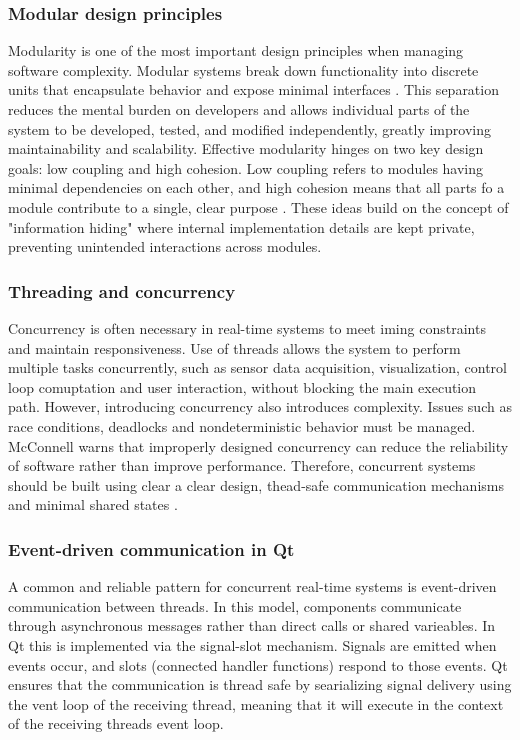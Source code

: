 \subsubsection{Modular design principles}
Modularity is one of the most important design principles when managing software complexity. Modular systems break down functionality into discrete units that encapsulate behavior and expose minimal interfaces \cite{steve_mcconnell_code_nodate}. This separation reduces the mental burden on developers and allows individual parts of the system to be developed, tested, and modified independently, greatly improving maintainability and scalability.
\newline \newline
Effective modularity hinges on two key design goals: low coupling and high cohesion. Low coupling refers to modules having minimal dependencies on each other, and high cohesion means that all parts fo a module contribute to a single, clear purpose \cite{steve_mcconnell_code_nodate}. These ideas build on the concept of "information hiding" \cite{parnas_criteria_1972} where internal implementation details are kept private, preventing unintended interactions across modules.

\subsubsection{Threading and concurrency}
Concurrency is often necessary in real-time systems to meet iming constraints and maintain responsiveness. Use of threads allows the system to perform multiple tasks concurrently, such as sensor data acquisition, visualization, control loop comuptation and user interaction, without blocking the main execution path.
\newline \newline
However, introducing concurrency also introduces complexity. Issues such as race conditions, deadlocks and nondeterministic behavior must be managed. McConnell \cite{mcconnell_code_2004} warns that improperly designed concurrency can reduce the reliability of software rather than improve performance. Therefore, concurrent systems should be built using clear a clear design, thead-safe communication mechanisms and minimal shared states \cite{noauthor_software_nodate}.

\subsubsection{Event-driven communication in Qt}
A common and reliable pattern for concurrent real-time systems is event-driven communication between threads. In this model, components communicate through asynchronous messages rather than direct calls or shared varieables. In Qt this is implemented via the signal-slot mechanism. Signals are emitted when events occur, and slots (connected handler functions) respond to those events. Qt ensures that the communication is thread safe by searializing signal delivery using the vent loop of the receiving thread, meaning that it will execute in the context of the receiving threads event loop. 

